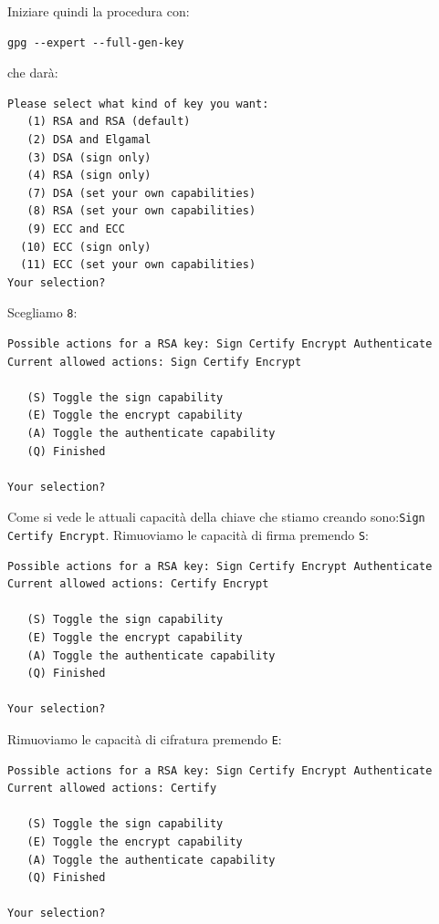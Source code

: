 \documentclass[a4paper,10pt]{article}
\begin{document}
Iniziare quindi la procedura con:

\begin{lstlisting}
gpg --expert --full-gen-key
\end{lstlisting}

che darà:

\begin{lstlisting}
Please select what kind of key you want:
   (1) RSA and RSA (default)
   (2) DSA and Elgamal
   (3) DSA (sign only)
   (4) RSA (sign only)
   (7) DSA (set your own capabilities)
   (8) RSA (set your own capabilities)
   (9) ECC and ECC
  (10) ECC (sign only)
  (11) ECC (set your own capabilities)
Your selection?
\end{lstlisting}

Scegliamo \texttt{8}:

\begin{lstlisting}
Possible actions for a RSA key: Sign Certify Encrypt Authenticate
Current allowed actions: Sign Certify Encrypt

   (S) Toggle the sign capability
   (E) Toggle the encrypt capability
   (A) Toggle the authenticate capability
   (Q) Finished

Your selection?
\end{lstlisting}

Come si vede le attuali capacità della chiave che stiamo creando sono:\newline \texttt{Sign Certify Encrypt}. Rimuoviamo le capacità di firma premendo \texttt{S}:

\begin{lstlisting}
Possible actions for a RSA key: Sign Certify Encrypt Authenticate
Current allowed actions: Certify Encrypt

   (S) Toggle the sign capability
   (E) Toggle the encrypt capability
   (A) Toggle the authenticate capability
   (Q) Finished

Your selection?
\end{lstlisting}

Rimuoviamo le capacità di cifratura premendo \texttt{E}:

\begin{lstlisting}
Possible actions for a RSA key: Sign Certify Encrypt Authenticate
Current allowed actions: Certify

   (S) Toggle the sign capability
   (E) Toggle the encrypt capability
   (A) Toggle the authenticate capability
   (Q) Finished

Your selection?
\end{lstlisting}
\end{document}
